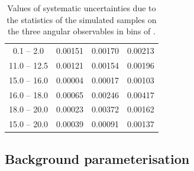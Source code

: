 \begin{table}[h]
\centering
\caption{Values of systematic uncertainties due to the statistics of the simulated
samples on the three angular observables in bins of \qsq.}
\begin{tabular}{c|ccc}
\boldmath{ \qsq [\gevgevcccc] } &  \boldmath{ $\afbl$}   &  \boldmath{ \fl } &  \boldmath{ $\afbh$ } \\ \hline
\phantom{x}0.1 -- 2.0\phantom{x}     &  0.00151 & 0.00170  & 0.00213 \\
11.0 -- 12.5  &  0.00121 & 0.00154  & 0.00196 \\
15.0 -- 16.0  &  0.00004 & 0.00017  & 0.00103 \\
16.0 -- 18.0  &  0.00065 & 0.00246  & 0.00417 \\
18.0 -- 20.0  &  0.00023 & 0.00372  & 0.00162 \\
\hline
15.0 -- 20.0  &  0.00039 & 0.00091  & 0.00137 \\
\end{tabular}
\label{tab:stateffsys}
\end{table}


\subsection{Background parameterisation}
\label{sec:bkgShapeSys}

